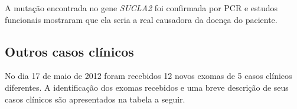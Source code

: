 A mutação encontrada no gene \textit{SUCLA2} foi confirmada por PCR e estudos funcionais mostraram que ela seria a real causadora da doença do paciente.

\subsection{Outros casos clínicos}


No dia 17 de maio de 2012 foram recebidos 12 novos exomas de 5 casos clínicos diferentes. A identificação dos exomas recebidos e uma breve descrição de seus casos clínicos são apresentados na tabela a seguir.

